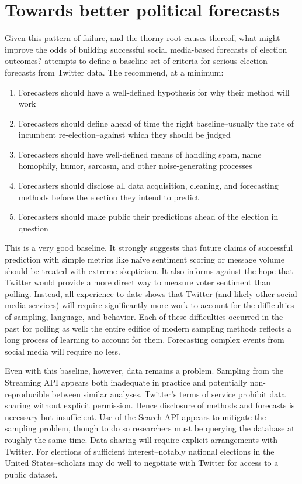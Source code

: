 \documentclass{article}
\begin{document}
\section{Towards better political forecasts}
\label{sec:towards-bett-polit}

Given this pattern of failure, and the thorny root causes thereof,
what might improve the odds of building successful social media-based
forecasts of election outcomes? \cite{gayo2012wanted} attempts to
define a baseline set of criteria for serious election forecasts from
Twitter data. The recommend, at a minimum:

\begin{enumerate}
\item Forecasters should have a well-defined hypothesis for why their
  method will work
\item Forecasters should define ahead of time the right
  baseline--usually the rate of incumbent re-election--against which
  they should be judged
\item Forecasters should have well-defined means of handling spam,
  name homophily, humor, sarcasm, and other noise-generating processes
\item Forecasters should disclose all data acquisition, cleaning, and
  forecasting methods before the election they intend to predict
\item Forecasters should make public their predictions ahead of the election in question
\end{enumerate}

This is a very good baseline. It strongly suggests that future claims
of successful prediction with simple metrics like na\"ive sentiment
scoring or message volume should be treated with extreme
skepticism. It also informs against the hope that Twitter would
provide a more direct way to measure voter sentiment than
polling. Instead, all experience to date shows that Twitter (and
likely other social media services) will require significantly more work to
account for the difficulties of sampling, language, and behavior. Each
of these difficulties occurred in the past for polling as well: the
entire edifice of modern sampling methods reflects a long process of
learning to account for them. Forecasting complex events from social
media will require no less.

Even with this baseline, however, data remains a problem. Sampling
from the Streaming API appears both inadequate in practice and
potentially non-reproducible between similar analyses. Twitter's terms
of service prohibit data sharing without explicit permission. Hence
disclosure of methods and forecasts is necessary but insufficient. Use
of the Search API appears to mitigate the sampling problem, though to
do so researchers must be querying the database at roughly the same
time. Data sharing will require explicit arrangements with
Twitter. For elections of sufficient interest--notably national
elections in the United States--scholars may do well to negotiate with
Twitter for access to a public dataset.
\end{document}
